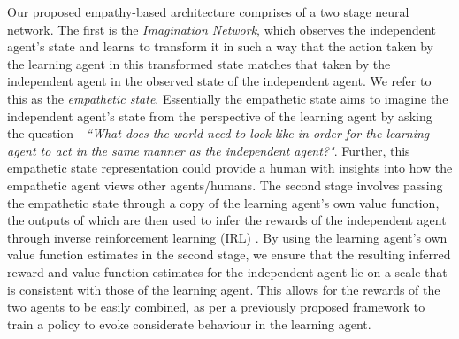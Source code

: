 
Our proposed empathy-based architecture comprises of a two stage neural network. The first is the \emph{Imagination Network}, which observes the independent agent's state and learns to transform it in such a way that the action taken by the learning agent in this transformed state matches that taken by the independent agent in the observed state of the independent agent. We refer to this as the \textit{empathetic state}. Essentially the empathetic state aims to imagine the independent agent's state from the perspective of the learning agent by asking the question - \emph{``What does the world need to look like in order for the learning agent to act in the same manner as the independent agent?"}. Further, this empathetic state representation could provide a human with insights into how the empathetic agent views other agents/humans. %
 The second stage involves passing the empathetic state through a copy of the learning agent's own value function, the outputs of which are then used to infer the rewards of the independent agent through inverse reinforcement learning (IRL) \cite{ng2000algorithms}. 
 By using the learning agent's own value function estimates in the second stage, we ensure that the resulting inferred reward and value function estimates for the independent agent lie on a scale that is consistent with those of the learning agent. This allows for the rewards of the two agents to be easily combined, as per a previously proposed framework \cite{SympathyPaper} to train a policy to evoke considerate behaviour in the learning agent.  %

